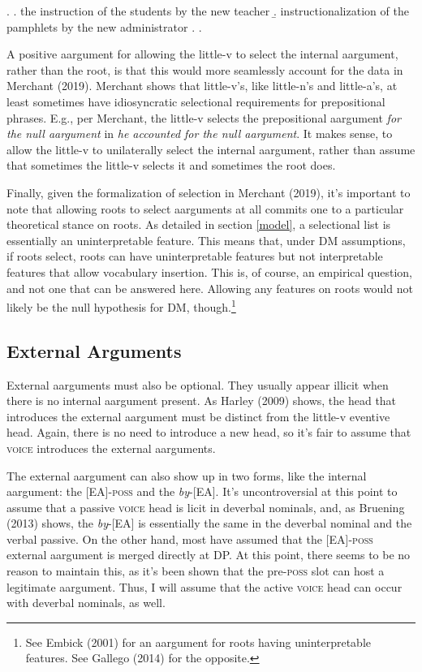 \documentclass[12pt]{article}
\begin{document}
\singlespacing

\ex. 
\a. the instruction of the students by the new teacher
\b. instructionalization of the pamphlets by the new administrator
\z. \z. \par


\doublespacing

A positive aargument for allowing the little-v to select the internal aargument, rather than the root, is that this would more seamlessly account for the data in Merchant (2019). Merchant shows that little-v's, like little-n's and little-a's, at least sometimes have idiosyncratic selectional requirements for prepositional phrases. E.g., per Merchant, the little-v selects the prepositional aargument \textit{for the null aargument} in \textit{he accounted for the null aargument}. It makes sense, to allow the little-v to unilaterally select the internal aargument, rather than assume that sometimes the little-v selects it and sometimes the root does.


Finally, given the formalization of selection in Merchant (2019), it's important to note that allowing roots to select aarguments at all commits one to a particular theoretical stance on roots. As detailed in section \ref{model}, a selectional list is essentially an uninterpretable feature. This means that, under DM assumptions, if roots select, roots can have uninterpretable features but not interpretable features that allow vocabulary insertion. This is, of course, an empirical question, and not one that can be answered here. Allowing any features on roots would not likely be the null hypothesis for DM, though.\footnote{ See Embick (2001) for an aargument for roots having uninterpretable features. See Gallego (2014) for the opposite.}


\subsection{External Arguments}\label{disc3}

External aarguments must also be optional. They usually appear illicit when there is no internal aargument present. As Harley (2009) shows, the head that introduces the external aargument must be distinct from the little-v eventive head. Again, there is no need to introduce a new head, so it's fair to assume that \textsc{voice} introduces the external aarguments.

The external aargument can also show up in two forms, like the internal aargument: the [EA]-\textsc{poss} and the \textit{by}-[EA]. It's uncontroversial at this point to assume that a passive \textsc{voice} head is licit in deverbal nominals, and, as Bruening (2013) shows, the \textit{by}-[EA] is essentially the same in the deverbal nominal and the verbal passive. On the other hand, most have assumed that the [EA]-\textsc{poss} external aargument is merged directly at DP. At this point, there seems to be no reason to maintain this, as it's been shown that the pre-\textsc{poss} slot can host a legitimate aargument. Thus, I will assume that the active \textsc{voice} head can occur with deverbal nominals, as well.
\end{document}
